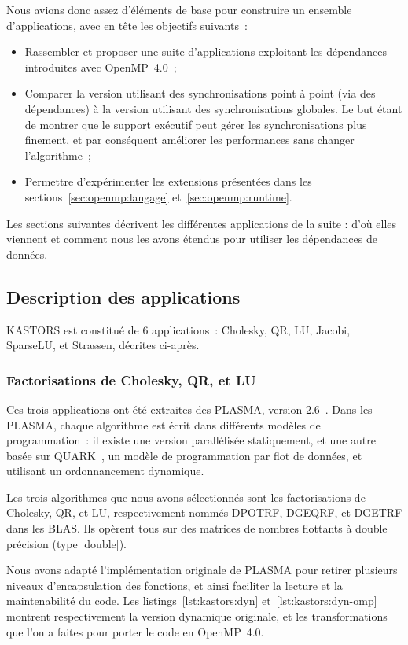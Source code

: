 Nous avions donc assez d'éléments de base pour construire un ensemble d'applications, avec en tête les objectifs suivants~:
\begin{itemize}
  \item Rassembler et proposer une suite d'applications exploitant les dépendances introduites avec OpenMP~4.0~;
  \item Comparer la version utilisant des synchronisations point à point (via des dépendances) à la version utilisant des synchronisations globales. Le but étant de montrer que le support exécutif peut gérer les synchronisations plus finement, et par conséquent améliorer les performances sans changer l'algorithme~;
  \item Permettre d'expérimenter les extensions présentées dans les sections~\ref{sec:openmp:langage} et~\ref{sec:openmp:runtime}.
\end{itemize}

Les sections suivantes décrivent les différentes applications de la suite : d'où elles viennent et comment nous les avons étendus pour utiliser les dépendances de données.


\subsection{Description des applications}

KASTORS est constitué de 6 applications~: Cholesky, QR, LU, Jacobi, SparseLU, et Strassen, décrites ci-après.

\subsubsection{Factorisations de Cholesky, QR, et LU}

Ces trois applications ont été extraites des PLASMA, version 2.6~\cite{PLASMA2.6}.
Dans les PLASMA, chaque algorithme est écrit dans différents modèles de programmation~: il existe une version parallélisée statiquement, et une autre basée sur QUARK~\cite{YarKhan2011}, un modèle de programmation par flot de données, et utilisant un ordonnancement dynamique.

Les trois algorithmes que nous avons sélectionnés sont les factorisations de Cholesky, QR, et LU, respectivement nommés DPOTRF, DGEQRF, et DGETRF dans les BLAS.
Ils opèrent tous sur des matrices de nombres flottants à double précision (type |double|).

Nous avons adapté l'implémentation originale de PLASMA pour retirer plusieurs niveaux d'encapsulation des fonctions, et ainsi faciliter la lecture et la maintenabilité du code.
Les listings~\ref{lst:kastors:dyn} et~\ref{lst:kastors:dyn-omp} montrent respectivement la version dynamique originale, et les transformations que l'on a faites pour porter le code en OpenMP~4.0.

